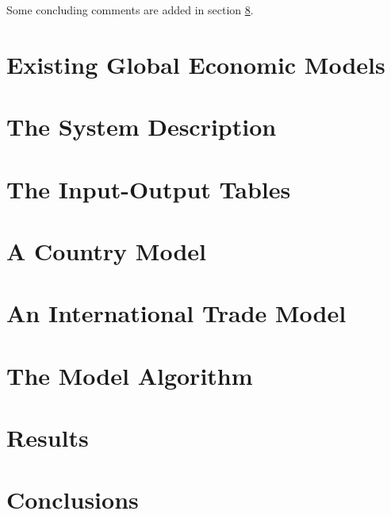 \documentclass[a4paper]{article}
\begin{document}
Some concluding comments are added in section \ref{sec:conclusions}.

\section{Existing Global Economic Models} \label{sec:litreview}

\section{The System Description} \label{sec:system}

\section{The Input-Output Tables} \label{sec:iots}

\section{A Country Model}\label{sec:countries}

\section{An International Trade Model}\label{sec:trade}

\section{The Model Algorithm}\label{sec:algorithm}

\section{Results}\label{sec:results}

\section{Conclusions}\label{sec:conclusions}

\printbibliography
\end{document}
